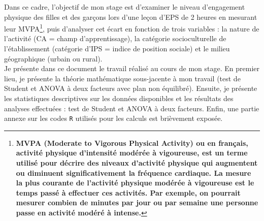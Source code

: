 \documentclass[12pt,a4paper]{article}
\begin{document}
Dans ce cadre, l'objectif de mon stage est d'examiner le niveau d'engagement physique des filles et des garçons lors d'une leçon d'EPS de 2 heures en mesurant leur MVPA\footnote{\textbf{MVPA (Moderate to Vigorous Physical Activity) ou en français, activité physique d'intensité modérée à vigoureuse, est un terme utilisé pour décrire des niveaux d'activité physique qui augmentent ou diminuent significativement la fréquence cardiaque. La mesure la plus courante de l'activité physique modérée à vigoureuse est le temps passé à effectuer ces activités. Par exemple, on pourrait mesurer combien de minutes par jour ou par semaine une personne passe en activité modéré à intense.}}, puis d'analyser cet écart en fonction de trois variables : la nature de l'activité (CA = champ d'apprentissage), la catégorie socioculturelle de l'établissement (catégorie d'IPS = indice de position sociale) et le milieu géographique (urbain ou rural).\\
Je présente dans ce document le travail réalisé au cours de mon stage. En premier lieu, je présente la théorie mathématique sous-jacente à mon travail (test de Student et ANOVA à deux facteurs avec plan non équilibré). Ensuite, je présente les statistiques descriptives sur les données disponibles et les résultats des analyses effectuées : test de Student et ANOVA à deux facteurs. Enfin, une partie annexe sur les codes \texttt{R} utilisés pour les calculs est brièvement exposée.

	\newpage
\end{document}
